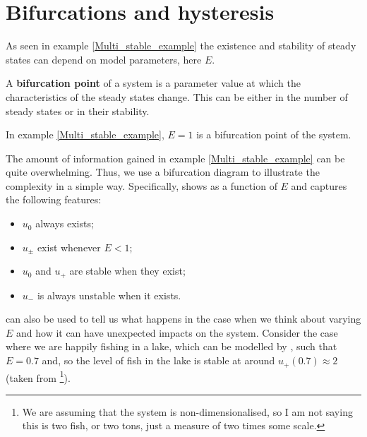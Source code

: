 \section{Bifurcations and hysteresis}\label{Hysteresis}
As seen in example \ref{Multi_stable_example} the existence and stability of steady states can depend on model parameters, here $E$.
\begin{defin}
A \textbf{bifurcation point} of a system is a parameter value at which the characteristics of the steady states change. This can be either in the number of steady states or in their stability.
\end{defin}
In example \ref{Multi_stable_example}, $E=1$ is a bifurcation point of the system.

The amount of information gained in example \ref{Multi_stable_example} can be quite overwhelming. Thus, we use a bifurcation diagram to illustrate the complexity in a simple way. Specifically,  shows  as a function of $E$ and captures the following features:
\begin{itemize}
\item $u_0$ always exists;
\item $u_\pm$ exist whenever $E<1$;
\item $u_0$ and $u_+$ are stable when they exist;
\item $u_-$ is always unstable when it exists.
\end{itemize}

 can also be used to tell us what happens in the case when we think about varying $E$ and how it can have unexpected impacts on the system. Consider the case where we are happily fishing in a lake, which can be modelled by , such that $E=0.7$ and, so the level of fish in the lake is stable at around $u_+(0.7)\approx 2$ (taken from \footnote{We are assuming that the system is non-dimensionalised, so I am not saying this is two fish, or two tons, just a measure of two times some scale.}).

